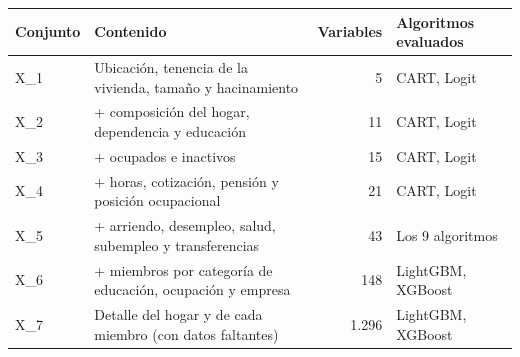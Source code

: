 
\begin{tabular}{llrl}
\toprule
Conjunto & Contenido & Variables & Algoritmos evaluados\\
\midrule
X\_1 & Ubicación, tenencia de la vivienda, tamaño y hacinamiento & 5 & CART, Logit\\
X\_2 & + composición del hogar, dependencia y educación & 11 & CART, Logit\\
X\_3 & + ocupados e inactivos & 15 & CART, Logit\\
X\_4 & + horas, cotización, pensión y posición ocupacional & 21 & CART, Logit\\
X\_5 & + arriendo, desempleo, salud, subempleo y transferencias & 43 & Los 9 algoritmos\\
X\_6 & + miembros por categoría de educación, ocupación y empresa & 148 & LightGBM, XGBoost\\
X\_7 & Detalle del hogar y de cada miembro (con datos faltantes) & 1.296 & LightGBM, XGBoost\\
\bottomrule
\end{tabular}
